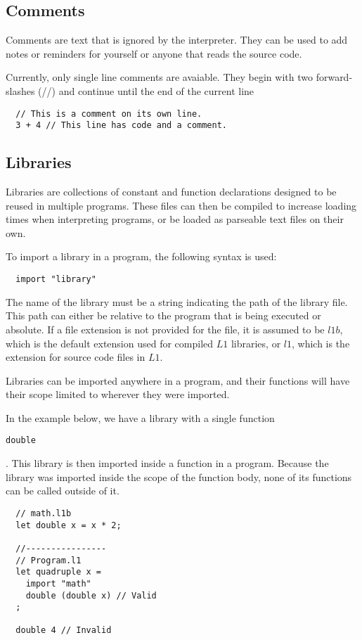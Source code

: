 \documentclass{article}
\def\code#1{\begin{footnotesize}\texttt{#1}\end{footnotesize}}
\begin{document}
\subsection{Comments}
Comments are text that is ignored by the interpreter.
They can be used to add notes or reminders for yourself or anyone that reads the source code.

Currently, only single line comments are avaiable.
They begin with two forward-slashes (//) and continue until the end of the current line

\begin{lstlisting}
  // This is a comment on its own line.
  3 + 4 // This line has code and a comment.
\end{lstlisting}

\subsection{Libraries}

Libraries are collections of constant and function declarations designed to be reused in multiple programs.
These files can then be compiled to increase loading times when interpreting programs, or be loaded as parseable text files on their own.

To import a library in a program, the following syntax is used:

\begin{lstlisting}
  import "library"
\end{lstlisting}

The name of the library must be a string indicating the path of the library file.
This path can either be relative to the program that is being executed or absolute.
If a file extension is not provided for the file, it is assumed to be $l1b$, which is the default extension used for compiled $L1$ libraries, or $l1$, which is  the extension for source code files in $L1$.

Libraries can be imported anywhere in a program, and their functions will have their scope limited to wherever they were imported.

In the example below, we have a library with a single function \code{double}.
This library is then imported inside a function in a program.
Because the library was imported inside the scope of the function body, none of its functions can be called outside of it.

\begin{lstlisting}
  // math.l1b
  let double x = x * 2;

  //----------------
  // Program.l1
  let quadruple x =
    import "math"
    double (double x) // Valid
  ;

  double 4 // Invalid
\end{lstlisting}
\end{document}
